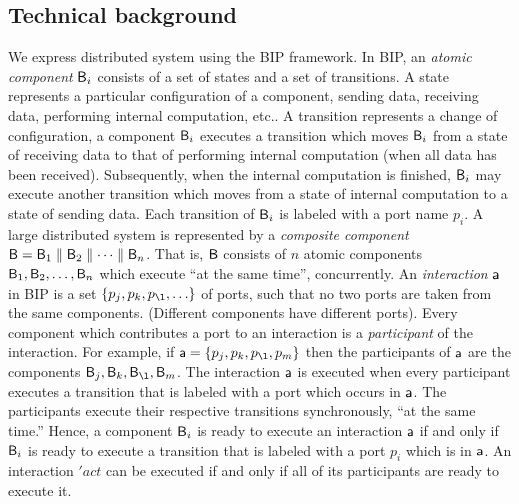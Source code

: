 

\subsection{Technical background}

We express distributed system using the BIP \cite{bip06,BliudzeS08} framework. In BIP, an \emph{atomic component} $\mathsf{B}_i$ consists of a set of states and a set of
transitions. A state represents a particular configuration of a component, \eg sending data, receiving data, performing internal computation, etc..
A transition represents a change of configuration, \eg a component $\mathsf{B}_i$ executes a transition which moves $\mathsf{B}_i$ from a 
state of receiving data to that of performing internal computation (\eg when all data has been received). Subsequently, when the internal computation
is finished, $\mathsf{B}_i$ may execute another transition which moves from a state of internal computation to a state of sending data.
Each transition of $\mathsf{B}_i$ is labeled with a port name $p_i$. 
A large distributed system is represented by a \emph{composite component} $\mathsf{B} = \mathsf{B}_1 \parallel \mathsf{B}_2 \parallel \cdots \parallel \mathsf{B}_n$. That is, $\mathsf{B}$ consists of $n$
atomic components $\mathsf{B}_1, \mathsf{B}_2,  \ldots,  \mathsf{B}_n$ which execute ``at the same time'', \ie concurrently. 
An \emph{interaction} $\mathsf{a}$ in BIP is a set $\{ p_j, p_k, p_{\l}, \ldots \}$ of ports, such that no two ports are taken from the same components.
(Different components have different ports). Every component which contributes a port to an interaction is a \emph{participant} of the interaction.
For example, if  $\act = \{ p_j, p_k, p_{\l}, p_m \}$ then the participants of $\mathsf{a}$ are the components $\B_j, \B_k, \B_{\l}, \B_m$.
The interaction $\mathsf{a}$ is executed when every participant executes a transition that is labeled with a port which occurs in $\mathsf{a}$. 
The participants execute their respective transitions synchronously,
\ie ``at the same time.'' 
%
Hence, a component $\mathsf{B}_i$ is ready to execute an interaction $\mathsf{a}$
if and only if $\mathsf{B}_i$ is ready to execute a transition that is labeled
with a port $p_i$ which is in $\mathsf{a}$.
An interaction $'act$ can be executed if and only if all of its
participants are ready to execute it.